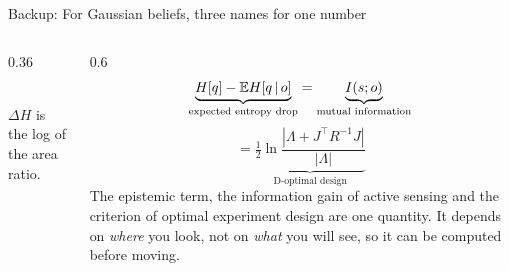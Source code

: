 \documentclass[10pt, aspectratio=169]{beamer}
\begin{document}
\begin{frame}{Backup: For Gaussian beliefs, three names for one number}
  \begin{columns}[c]
    \begin{column}{0.36\textwidth}
      \centering
      \\[0.3em]
      {\small $\Delta H$ is the log of the area ratio.}
    \end{column}
    \begin{column}{0.6\textwidth}
      \[
        \underbrace{H[q]-\mathbb{E} H[q\,|\, o]}_{\text{expected entropy drop}}
        = \underbrace{I(s;o)}_{\text{mutual information}}
      \]
      \[
        = \underbrace{\tfrac12\ln\frac{|\Lambda + J^\top R^{-1}J|}{|\Lambda|}}_{\text{D-optimal design}}
      \]
      \small
      The epistemic term, the information gain of active sensing and the criterion of optimal
      experiment design are \alert{one quantity}. It depends on \emph{where} you look, not on
      \emph{what} you will see, so it can be computed before moving.
    \end{column}
  \end{columns}
\end{frame}
\end{document}
